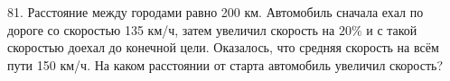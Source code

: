 81.  Расстояние между городами равно 200 км. Автомобиль сначала ехал по дороге со скоростью
135 км/ч, затем увеличил скорость на $20\%$ и с такой скоростью доехал до конечной цели. Оказалось,
что средняя скорость на всём пути 150 км/ч. На каком расстоянии от старта автомобиль увеличил
скорость?
\newpage
